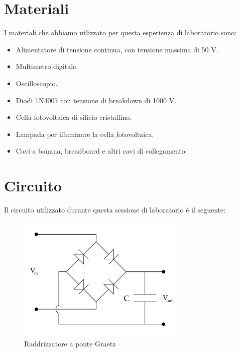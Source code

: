 \section*{Materiali}

I materiali che abbiamo utlizzato per questa esperienza di laboratorio sono:

\begin{itemize}
    \setlength{\itemsep}{0.5pt}
    \item{Alimentatore di tensione continua, con tensione massima di 50 V.}
    \item{Multimetro digitale.}
    \item{Oscilloscopio.}
    \item{Diodi 1N4007 con tensione di breakdown di 1000 V.}
    \item{Cella fotovoltaica di silicio cristallino.}
    \item{Lampada per illuminare la cella fotovoltaica.}
    \item{Cavi a banana, breadboard e altri cavi di collegamento}
\end{itemize}

\section*{Circuito}

Il circuito utilizzato durante questa sessione di laboratorio è il seguente:

\begin{figure}[h]
	\centering
    \includegraphics[width=8cm]{graetz.pdf}
    \caption{Raddrizzatore a ponte Graetz}
    \label{fig:graetz}
\end{figure}
